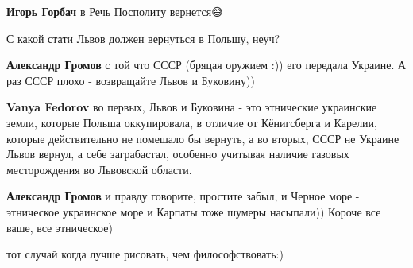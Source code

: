 \begin{itemize}
\begin{itemize}
\textbf{Игорь Горбач} в Речь Посполиту вернется😅

 
С какой стати Львов должен вернуться в Польшу, неуч?

 
\textbf{Александр Громов} с той что СССР (бряцая оружием :)) его передала Украине. А раз СССР плохо - возвращайте Львов и Буковину))

 
\textbf{Vanya Fedorov} во первых, Львов и Буковина - это этнические украинские земли, которые Польша оккупировала, в отличие от Кёнигсберга и Карелии, которые действительно не помешало бы вернуть, а во вторых, СССР не Украине Львов вернул, а себе заграбастал, особенно учитывая наличие газовых месторождения во Львовской области.

 
\textbf{Александр Громов} и правду говорите, простите забыл, и Черное море - этническое украинское море и Карпаты тоже шумеры насыпали)) Короче все ваше, все этническое)

\end{itemize}

 
тот случай когда лучше рисовать, чем философствовать:)

\begin{itemize}
 

\end{itemize}
\end{itemize}
